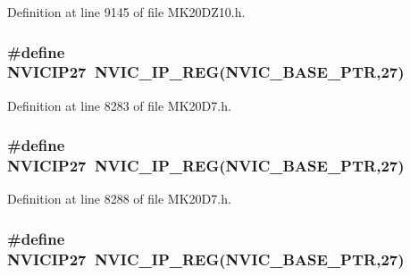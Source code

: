 Definition at line 9145 of file M\+K20\+D\+Z10.\+h.

\subsubsection[{\texorpdfstring{N\+V\+I\+C\+I\+P27}{NVICIP27}}]{\setlength{\rightskip}{0pt plus 5cm}\#define N\+V\+I\+C\+I\+P27~{\bf N\+V\+I\+C\+\_\+\+I\+P\+\_\+\+R\+EG}({\bf N\+V\+I\+C\+\_\+\+B\+A\+S\+E\+\_\+\+P\+TR},27)}\hypertarget{group___n_v_i_c___register___accessor___macros_gace7564e7befee6c27d7682938a1af4a1}{}\label{group___n_v_i_c___register___accessor___macros_gace7564e7befee6c27d7682938a1af4a1}


Definition at line 8283 of file M\+K20\+D7.\+h.

\subsubsection[{\texorpdfstring{N\+V\+I\+C\+I\+P27}{NVICIP27}}]{\setlength{\rightskip}{0pt plus 5cm}\#define N\+V\+I\+C\+I\+P27~{\bf N\+V\+I\+C\+\_\+\+I\+P\+\_\+\+R\+EG}({\bf N\+V\+I\+C\+\_\+\+B\+A\+S\+E\+\_\+\+P\+TR},27)}\hypertarget{group___n_v_i_c___register___accessor___macros_gace7564e7befee6c27d7682938a1af4a1}{}\label{group___n_v_i_c___register___accessor___macros_gace7564e7befee6c27d7682938a1af4a1}


Definition at line 8288 of file M\+K20\+D7.\+h.

\subsubsection[{\texorpdfstring{N\+V\+I\+C\+I\+P27}{NVICIP27}}]{\setlength{\rightskip}{0pt plus 5cm}\#define N\+V\+I\+C\+I\+P27~{\bf N\+V\+I\+C\+\_\+\+I\+P\+\_\+\+R\+EG}({\bf N\+V\+I\+C\+\_\+\+B\+A\+S\+E\+\_\+\+P\+TR},27)}\hypertarget{group___n_v_i_c___register___accessor___macros_gace7564e7befee6c27d7682938a1af4a1}{}\label{group___n_v_i_c___register___accessor___macros_gace7564e7befee6c27d7682938a1af4a1}


